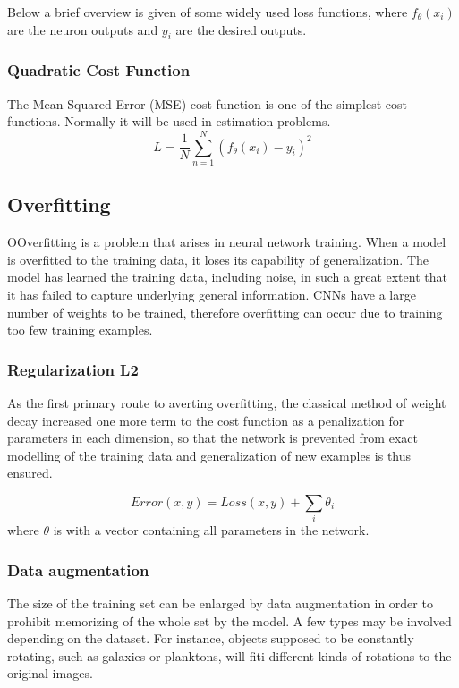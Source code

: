     Below a brief overview is given of some widely used loss functions, where $f_{\theta}(x_i)$ are the neuron outputs and $y_i$ are the desired outputs.
    \subsubsection{Quadratic Cost Function}
    The Mean Squared Error (MSE) cost function is one of the simplest cost functions. Normally it will be used in estimation problems\cite{boureau2008sparse}.
    \begin{equation}
        L =\frac{1}{N}\sum_{n=1}^{N}(f_{\theta}(x_i) - y_i)^2
        \label{eq:mse}
    \end{equation}


    \subsection{Overfitting}
    OOverfitting is a problem that arises in neural network training. When a model is overfitted to the training data, it loses its capability of generalization. The model has learned the training data, including noise, in such a great extent that it has failed to capture underlying general information. CNNs have a large number of weights to be trained, therefore overfitting can occur due to training too few training examples.

    \subsubsection{Regularization L2}
     As the first primary route to averting overfitting, the classical method of weight decay increased one more term to the cost function as a penalization for parameters in each dimension, so that the network is prevented from exact modelling of the training data and generalization of new examples is thus ensured. 

    \begin{equation}
        Error(x, y) =  Loss(x, y) + \sum_{i}\theta_i
    \end{equation}
    where $\theta$ is with a vector containing all parameters in the network.

    \subsubsection{Data augmentation}
    The size of the training set can be enlarged by data augmentation in order to prohibit memorizing of the whole set by the model. A few types may be involved depending on the dataset. For instance, objects  supposed to be constantly rotating,  such as galaxies or planktons, will fiti different kinds of rotations to the original images.

